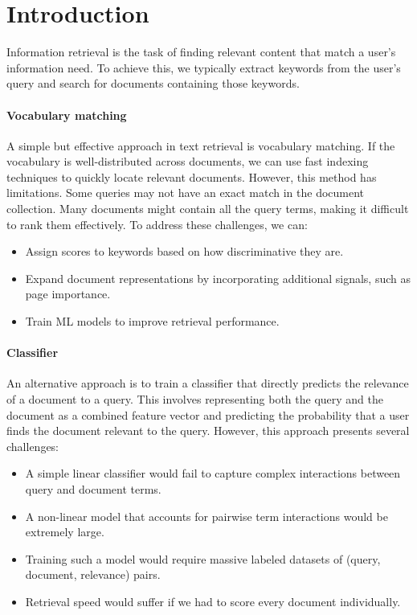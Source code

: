 \section{Introduction}

Information retrieval is the task of finding relevant content that match a user's information need.
To achieve this, we typically extract keywords from the user's query and search for documents containing those keywords.

\paragraph*{Vocabulary matching}
A simple but effective approach in text retrieval is vocabulary matching. 
If the vocabulary is well-distributed across documents, we can use fast indexing techniques to quickly locate relevant documents. 
However, this method has limitations.
Some queries may not have an exact match in the document collection.
Many documents might contain all the query terms, making it difficult to rank them effectively.
To address these challenges, we can: 
\begin{itemize}
    \item Assign scores to keywords based on how discriminative they are.
    \item Expand document representations by incorporating additional signals, such as page importance.
    \item Train ML models to improve retrieval performance.
\end{itemize}

\paragraph*{Classifier}
An alternative approach is to train a classifier that directly predicts the relevance of a document to a query. 
This involves representing both the query and the document as a combined feature vector and predicting the probability that a user finds the document relevant to the query.
However, this approach presents several challenges:
\begin{itemize}
    \item A simple linear classifier would fail to capture complex interactions between query and document terms.
    \item A non-linear model that accounts for pairwise term interactions would be extremely large.
    \item Training such a model would require massive labeled datasets of (query, document, relevance) pairs.
    \item Retrieval speed would suffer if we had to score every document individually.
\end{itemize}
